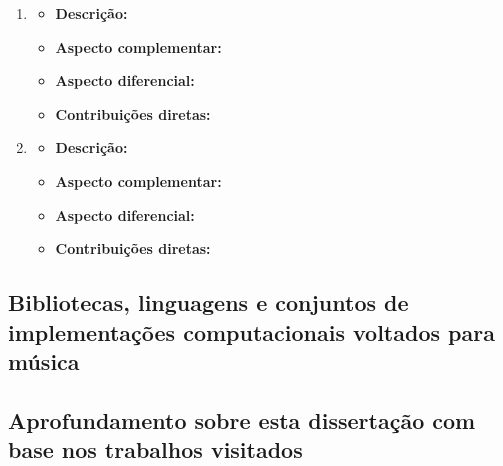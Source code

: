\begin{enumerate}
\begin{itemize}
        \end{itemize}
    \item \emph{}
        \begin{itemize}
            \item {\bf Descrição:}
            \item {\bf Aspecto complementar:}
            \item {\bf Aspecto diferencial:}
            \item {\bf Contribuições diretas:}
        \end{itemize}
    \item \emph{}
        \begin{itemize}
            \item {\bf Descrição:}
            \item {\bf Aspecto complementar:}
            \item {\bf Aspecto diferencial:}
            \item {\bf Contribuições diretas:}
        \end{itemize}
\end{enumerate}

\subsection{Bibliotecas, linguagens e conjuntos de implementações computacionais voltados para música}

\subsection{Aprofundamento sobre esta dissertação com base nos trabalhos visitados}


